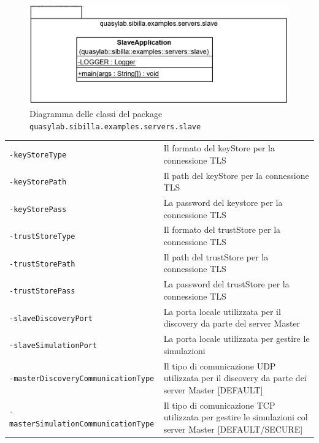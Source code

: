 \begin{figure}[H]
    \includegraphics[width=\linewidth]{images/quasylab.sibilla.examples.servers.slave.png}
    \captionsetup{justification=centering}
    \caption{Diagramma delle classi del package \texttt{quasylab.sibilla.examples.servers.slave}}
  \end{figure}

\begin{table}[H]
    \begin{tabularx}{\linewidth}{ l X }
        \texttt{-keyStoreType}        & Il formato del keyStore per la connessione TLS       \\
        \texttt{-keyStorePath}        & Il path del keyStore per la connessione TLS           \\
        \texttt{-keyStorePass}        & La password del keystore per la connessione TLS        \\
        \texttt{-trustStoreType}      & Il formato del trustStore per la connessione TLS     \\
        \texttt{-trustStorePath}      & Il path del trustStore per la connessione TLS         \\
        \texttt{-trustStorePass}      & La password del trustStore per la connessione TLS     \\
        \texttt{-slaveDiscoveryPort}                & La porta locale utilizzata per il discovery da parte del server Master                                              \\
        \texttt{-slaveSimulationPort} & La porta locale utilizzata per gestire le simulazioni \\
        \texttt{-masterDiscoveryCommunicationType}  & Il tipo di comunicazione UDP utilizzata per il discovery da parte dei server Master {[}DEFAULT{]}               \\
        \texttt{-masterSimulationCommunicationType} & Il tipo di comunicazione TCP utilizzata per gestire le simulazioni col server Master {[}DEFAULT/SECURE{]}
    \end{tabularx}
\end{table}